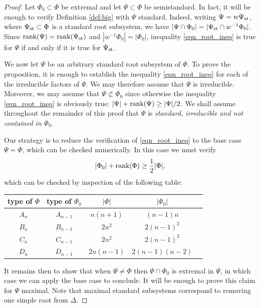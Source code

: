 \documentclass[12pt]{amsart}
\theoremstyle{remark}
\begin{document}
\begin{proof}
Let $\Phi_0\subset\Phi$ be extremal and let $\Psi\subset\Phi$ be semistandard. In fact, it will be enough to verify Definition \ref{def:big} with $\Psi$ standard. Indeed, writing $\Psi=w\Psi_{\rm st}$, where $\Psi_{\rm st}\subset\Phi$ is a standard root subsystem, we have $|\Psi \cap \Phi_0| = |\Psi_{\rm st} \cap w^{-1} \Phi_0|$. Since $\textnormal{rank}(\Psi)=\textnormal{rank}(\Psi_{\rm st})$ and $|w^{-1}\Phi_0|=|\Phi_0|$, inequality \eqref{eqn_root_ineq} is true for $\Psi$ if and only if it is true for $\Psi_{\rm st}$. 

We now let $\Psi$ be an arbitrary standard root subsystem of $\Phi$. To prove the proposition, it is enough to establish the inequality \eqref{eqn_root_ineq} for each of the irreducible factors of $\Psi$. We may therefore assume that $\Psi$ is irreducible. Moreover, we may assume that $\Psi\not\subset\Phi_0$ since otherwise the inequality \eqref{eqn_root_ineq}  is obviously true: $|\Psi|+\textnormal{rank}(\Psi)\geq |\Psi|/2$. We shall assume throughout the remainder of this proof that $\Psi$ is \textit{standard, irreducible and not contained in $\Phi_0$.}

Our strategy is to reduce  the verification of \eqref{eqn_root_ineq} to the base case $\Psi=\Phi$, which can be checked numerically. In this case we must verify
    \begin{equation}\label{basic-big-ineq}
        |\Phi_0|+\textnormal{rank}(\Phi) \geq \frac{1}{2} |\Phi|,
    \end{equation}
which can be checked by inspection of the following table:

    \begin{table}[H]
    \centering
 \begin{tabular}{|c|c|c|c|c|}
 \hline
  type of $\Phi$ & type of $\Phi_0$ & $|\Phi|$ & $|\Phi_0|$ \\ \hline  
  $A_n$ &$A_{n-1}$ & $n(n+1)$ & $(n-1)n$ \\
  $B_n$& $B_{n-1}$& $2 n^2$ & $2 (n-1)^2$  \\
  $C_n$& $C_{n-1}$& $2 n^2$& $2 (n-1)^2$ \\
  $D_n$& $D_{n-1}$& $2 n(n-1)$& $2(n-1)(n-2)$ \\
  \hline
 \end{tabular}
\end{table}
\noindent It remains then to show that when $\Psi\neq \Phi$ then $\Psi \cap \Phi_0$ is extremal in $\Psi$, in which case we can apply the base case to conclude. 
It will be enough to prove this claim for $\Psi$ maximal. Note that maximal standard subsystems correspond to removing one simple root from $\Delta$.


\end{proof}
\end{document}
